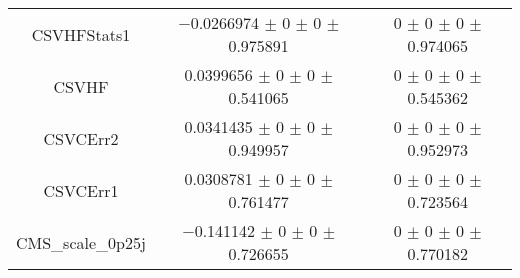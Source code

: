 \begin{table}
\begin{tabular}{ccc}
CSVHFStats1 & \num{-0.0266974} $\pm$ \num{0} $\pm$ \num{0} $\pm$ \num{0.975891} & \num{0} $\pm$ \num{0} $\pm$ \num{0} $\pm$ \num{0.974065}\\
CSVHF & \num{0.0399656} $\pm$ \num{0} $\pm$ \num{0} $\pm$ \num{0.541065} & \num{0} $\pm$ \num{0} $\pm$ \num{0} $\pm$ \num{0.545362}\\
CSVCErr2 & \num{0.0341435} $\pm$ \num{0} $\pm$ \num{0} $\pm$ \num{0.949957} & \num{0} $\pm$ \num{0} $\pm$ \num{0} $\pm$ \num{0.952973}\\
CSVCErr1 & \num{0.0308781} $\pm$ \num{0} $\pm$ \num{0} $\pm$ \num{0.761477} & \num{0} $\pm$ \num{0} $\pm$ \num{0} $\pm$ \num{0.723564}\\
CMS\_scale\_0p25j & \num{-0.141142} $\pm$ \num{0} $\pm$ \num{0} $\pm$ \num{0.726655} & \num{0} $\pm$ \num{0} $\pm$ \num{0} $\pm$ \num{0.770182}\\
\bottomrule
\end{tabular}
\end{table}